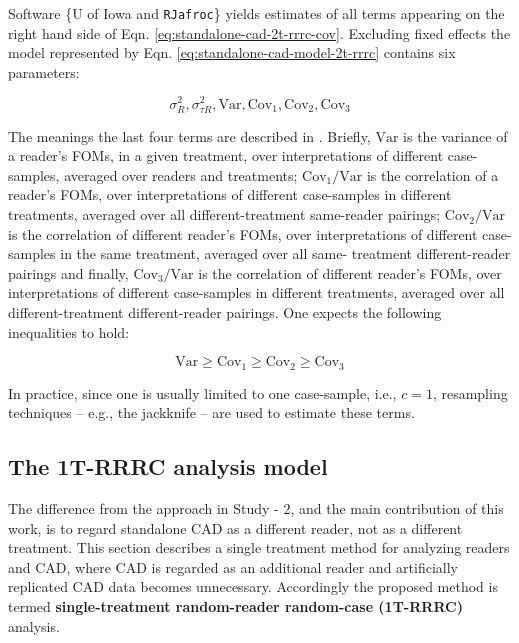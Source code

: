 \documentclass[
]{book}
\begin{document}
Software \{U of Iowa and \texttt{RJafroc}\} yields estimates of all terms appearing on the right hand side of Eqn. \eqref{eq:standalone-cad-2t-rrrc-cov}. Excluding fixed effects the model represented by Eqn. \eqref{eq:standalone-cad-model-2t-rrrc} contains six parameters:

\begin{equation}
\sigma_R^2, \sigma_{\tau R}^2, \text{Var}, \text{Cov}_1, \text{Cov}_2, \text{Cov}_3
\label{eq:standalone-cad-2t-rrrc-varcom}
\end{equation}

The meanings the last four terms are described in \citep{hillis2007comparison, obuchowski1995hypothesis, hillis2005comparison, chakraborty2017observer}. Briefly, \(\text{Var}\) is the variance of a reader's FOMs, in a given treatment, over interpretations of different case-samples, averaged over readers and treatments; \(\text{Cov}_1/\text{Var}\) is the correlation of a reader's FOMs, over interpretations of different case-samples in different treatments, averaged over all different-treatment same-reader pairings; \(\text{Cov}_2/\text{Var}\) is the correlation of different reader's FOMs, over interpretations of different case-samples in the same treatment, averaged over all same- treatment different-reader pairings and finally, \(\text{Cov}_3/\text{Var}\) is the correlation of different reader's FOMs, over interpretations of different case-samples in different treatments, averaged over all different-treatment different-reader pairings. One expects the following inequalities to hold:

\begin{equation}
\text{Var} \geq \text{Cov}_1 \geq \text{Cov}_2 \geq \text{Cov}_3
\label{eq:standalone-cad-2t-rrrc-varcom-ordering}
\end{equation}

In practice, since one is usually limited to one case-sample, i.e., \(c = 1\), resampling techniques \citep{efron1994introduction} -- e.g., the jackknife -- are used to estimate these terms.

\hypertarget{standalone-cad-radiologists-1TRRRC-anlaysis}{%
\subsection{The 1T-RRRC analysis model}\label{standalone-cad-radiologists-1TRRRC-anlaysis}}

The difference from the approach in Study - 2, and the main contribution of this work, is to regard standalone CAD as a different reader, not as a different treatment. This section describes a single treatment method for analyzing readers and CAD, where CAD is regarded as an additional reader and artificially replicated CAD data becomes unnecessary. Accordingly the proposed method is termed \textbf{single-treatment random-reader random-case (1T-RRRC)} analysis.
\end{document}
